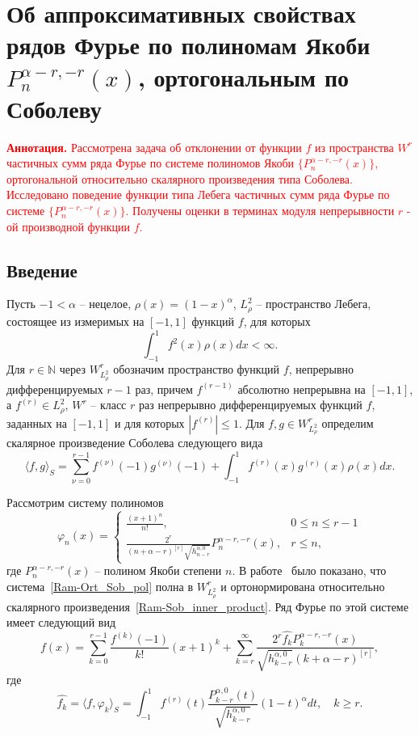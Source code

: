 \section{Об аппроксимативных свойствах рядов Фурье по полиномам Якоби \texorpdfstring{\linebreak$P_n^{\alpha-r,-r}(x)$}{}, ортогональным по Соболеву}\label{Ram-Jac}

\textcolor{red}{\textbf{ Аннотация.} Рассмотрена задача об отклонении от функции $f$ из пространства $W^r$ частичных сумм ряда Фурье по системе полиномов Якоби $\{P_n^{\alpha-r,-r}(x)\}$, ортогональной относительно скалярного произведения типа Соболева. Исследовано поведение функции типа Лебега частичных сумм ряда Фурье по системе $\{P_n^{\alpha-r,-r}(x)\}$. Получены оценки в терминах модуля непрерывности $r$ - ой производной функции $f$.}

\subsection{Введение}

Пусть $-1<\alpha$ -- нецелое, $\rho(x)=(1-x)^\alpha$, $L_\rho^2$ -- пространство Лебега, состоящее из измеримых на $[-1,1]$ функций $f$, для которых
$$
\int_{-1}^{1}f^2(x)\rho(x)dx<\infty.
$$
Для $r\in\mathbb{N}$ через $W^r_{L_\rho^2}$ обозначим пространство функций $f$, непрерывно дифференцируемых $r-1$ раз, причем $f^{(r-1)}$ абсолютно непрерывна на $[-1,1]$, а $f^{(r)}\in L_\rho^2$, $W^r$ -- класс $r$ раз непрерывно дифференцируемых функций $f$, заданных на $[-1,1]$ и для которых $|f^{(r)}|\le 1$.
Для $f,g\in W^r_{L_\rho^2}$ определим скалярное произведение Соболева следующего вида
\begin{equation}\label{Ram-Sob_inner_product}
\langle f,g\rangle_S=\sum_{\nu=0}^{r-1}f^{(\nu)}(-1)g^{(\nu)}(-1)+\int_{-1}^{1}f^{(r)}(x)g^{(r)}(x)\rho(x)dx.
\end{equation}

Рассмотрим систему полиномов
\begin{equation}\label{Ram-Ort_Sob_pol}
	\varphi_n(x)=
	\begin{cases}
		\frac{(x+1)^n}{n!}, & 0\le n\le r-1 \\
		\frac{2^r}{(n+\alpha-r)^{[r]}\sqrt{h_{n-r}^{\alpha,0}}}P_n^{\alpha-r,-r}(x), & r\le n,
	\end{cases}
\end{equation}
где $P_n^{\alpha-r,-r}(x)$ -- полином Якоби степени $n$. В работе~\cite{Ram-SharMN} было показано, что система~\eqref{Ram-Ort_Sob_pol} полна в $W^r_{L_\rho^2}$ и ортонормирована относительно скалярного произведения~\eqref{Ram-Sob_inner_product}. Ряд Фурье по этой системе имеет следующий вид
\begin{equation}\label{Ram-Fourier_series} f(x)=\sum_{k=0}^{r-1}\frac{f^{(k)}(-1)}{k!}(x+1)^k+\sum_{k=r}^{\infty}\frac{2^r\widehat{f_k}P_k^{\alpha-r,-r}(x)}{\sqrt{h_{k-r}^{\alpha,0}}(k+\alpha-r)^{[r]}},
\end{equation}
где
$$
\widehat{f_k}=\langle f,\varphi_k\rangle_S=\int_{-1}^{1}f^{(r)}(t)\frac{P_{k-r}^{\alpha,0}(t)}{\sqrt{h_{k-r}^{\alpha,0}}}(1-t)^\alpha dt, \quad k\ge r.
$$

